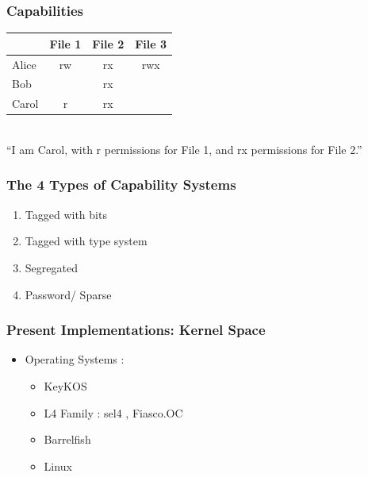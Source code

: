 \documentclass[xcolor=table]{beamer}
\begin{document}
\begin{frame}
  \frametitle{Capabilities}
  \begin{center}
    \begin{tabular}{|l||c|c|c|}
      \hline
      &File 1&File 2&File 3\\
      \hline
      \hline
      Alice&rw&rx&rwx\\
      \hline
      Bob&&rx&\\
      \hline
      \cellcolor{green}Carol&\cellcolor{green}r&\cellcolor{green}rx&\cellcolor{green}\\
      \hline
    \end{tabular}\\
    \vspace{10pt}
    ``I am Carol, with r permissions for File 1, and rx permissions for File 2.''
  \end{center}
\end{frame}

\begin{frame}
  \frametitle{The 4 Types of Capability Systems}
  
\begin{enumerate}
    \item{Tagged with bits}
    \item{Tagged with type system}
    \item{Segregated}
    \item{Password/ Sparse}
\end{enumerate}
 \end{frame}

\begin{frame}
    \frametitle{Present Implementations: Kernel Space}
     \begin{itemize}
         \item Operating Systems :
         \begin{itemize}
             \item KeyKOS
             \item L4 Family : sel4 , Fiasco.OC
             \item Barrelfish
             \item Linux
         \end{itemize}
     \end{itemize}
\end{frame}
\end{document}
